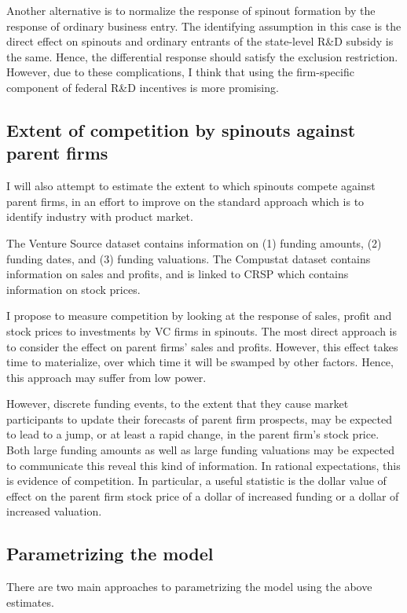 \documentclass[12pt,english]{article}
\theoremstyle{remark}
\begin{document}
Another alternative is to normalize the response of spinout formation by the response of ordinary business entry. The identifying assumption in this case is the direct effect on spinouts and ordinary entrants of the state-level R\&D subsidy is the same. Hence, the differential response should satisfy the exclusion restriction. However, due to these complications, I think that using the firm-specific component of federal R\&D incentives is more promising.

\subsection{Extent of competition by spinouts against parent firms}

I will also attempt to estimate the extent to which spinouts compete against parent firms, in an effort to improve on the standard approach which is to identify industry with product market. 

The Venture Source dataset contains information on (1) funding amounts, (2) funding dates, and (3) funding valuations. The Compustat dataset contains information on sales and profits, and is linked to CRSP which contains information on stock prices. 

I propose to measure competition by looking at the response of sales, profit and stock prices to investments by VC firms in spinouts. The most direct approach is to consider the effect on parent firms' sales and profits. However, this effect takes time to materialize, over which time it will be swamped by other factors. Hence, this approach may suffer from low power.

However, discrete funding events, to the extent that they cause market participants to update their forecasts of parent firm prospects, may be expected to lead to a jump, or at least a rapid change, in the parent firm's stock price. Both large funding amounts as well as large funding valuations may be expected to communicate this reveal this kind of information. In rational expectations, this is evidence of competition. In particular, a useful statistic is the dollar value of effect on the parent firm stock price of a dollar of increased funding or a dollar of increased valuation. 

\subsection{Parametrizing the model}

There are two main approaches to parametrizing the model using the above estimates. 
\end{document}
